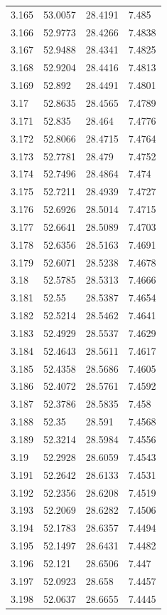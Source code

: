 \begin{tabular}{llll}
3.165 & 53.0057 & 28.4191 & 7.485 \\
3.166 & 52.9773 & 28.4266 & 7.4838 \\
3.167 & 52.9488 & 28.4341 & 7.4825 \\
3.168 & 52.9204 & 28.4416 & 7.4813 \\
3.169 & 52.892 & 28.4491 & 7.4801 \\
3.17 & 52.8635 & 28.4565 & 7.4789 \\
3.171 & 52.835 & 28.464 & 7.4776 \\
3.172 & 52.8066 & 28.4715 & 7.4764 \\
3.173 & 52.7781 & 28.479 & 7.4752 \\
3.174 & 52.7496 & 28.4864 & 7.474 \\
3.175 & 52.7211 & 28.4939 & 7.4727 \\
3.176 & 52.6926 & 28.5014 & 7.4715 \\
3.177 & 52.6641 & 28.5089 & 7.4703 \\
3.178 & 52.6356 & 28.5163 & 7.4691 \\
3.179 & 52.6071 & 28.5238 & 7.4678 \\
3.18 & 52.5785 & 28.5313 & 7.4666 \\
3.181 & 52.55 & 28.5387 & 7.4654 \\
3.182 & 52.5214 & 28.5462 & 7.4641 \\
3.183 & 52.4929 & 28.5537 & 7.4629 \\
3.184 & 52.4643 & 28.5611 & 7.4617 \\
3.185 & 52.4358 & 28.5686 & 7.4605 \\
3.186 & 52.4072 & 28.5761 & 7.4592 \\
3.187 & 52.3786 & 28.5835 & 7.458 \\
3.188 & 52.35 & 28.591 & 7.4568 \\
3.189 & 52.3214 & 28.5984 & 7.4556 \\
3.19 & 52.2928 & 28.6059 & 7.4543 \\
3.191 & 52.2642 & 28.6133 & 7.4531 \\
3.192 & 52.2356 & 28.6208 & 7.4519 \\
3.193 & 52.2069 & 28.6282 & 7.4506 \\
3.194 & 52.1783 & 28.6357 & 7.4494 \\
3.195 & 52.1497 & 28.6431 & 7.4482 \\
3.196 & 52.121 & 28.6506 & 7.447 \\
3.197 & 52.0923 & 28.658 & 7.4457 \\
3.198 & 52.0637 & 28.6655 & 7.4445 \\

\end{tabular}
